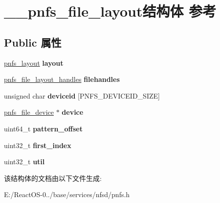\hypertarget{struct____pnfs__file__layout}{}\section{\+\_\+\+\_\+pnfs\+\_\+file\+\_\+layout结构体 参考}
\label{struct____pnfs__file__layout}
\subsection*{Public 属性}
\begin{DoxyCompactItemize}
\item 
\mbox{\label{struct____pnfs__file__layout_aaa37ea1566a06ccaf327d9d8e5de7f68}} 
\hyperlink{struct____pnfs__layout}{pnfs\+\_\+layout} {\bfseries layout}
\item 
\mbox{\label{struct____pnfs__file__layout_aec6befbcb4e266292bc301a9e143b4a6}} 
\hyperlink{struct____pnfs__file__layout__handles}{pnfs\+\_\+file\+\_\+layout\+\_\+handles} {\bfseries filehandles}
\item 
\mbox{\label{struct____pnfs__file__layout_aec27a91a72da21a9d56aa44a6a25ad01}} 
unsigned char {\bfseries deviceid} \mbox{[}P\+N\+F\+S\+\_\+\+D\+E\+V\+I\+C\+E\+I\+D\+\_\+\+S\+I\+ZE\mbox{]}
\item 
\mbox{\label{struct____pnfs__file__layout_a8099ee5ac5e9d15171d97196d40cc21e}} 
\hyperlink{struct____pnfs__file__device}{pnfs\+\_\+file\+\_\+device} $\ast$ {\bfseries device}
\item 
\mbox{\label{struct____pnfs__file__layout_ac7d1abafa5750e1f74f8ffb06de3c484}} 
uint64\+\_\+t {\bfseries pattern\+\_\+offset}
\item 
\mbox{\label{struct____pnfs__file__layout_a1675317132016d3a2cdff0f66ad92358}} 
uint32\+\_\+t {\bfseries first\+\_\+index}
\item 
\mbox{\label{struct____pnfs__file__layout_ab171246d0acb520f3226197a1d23a760}} 
uint32\+\_\+t {\bfseries util}
\end{DoxyCompactItemize}


该结构体的文档由以下文件生成\+:\begin{DoxyCompactItemize}
\item 
E\+:/\+React\+O\+S-\/0../base/services/nfsd/pnfs.\+h\end{DoxyCompactItemize}
